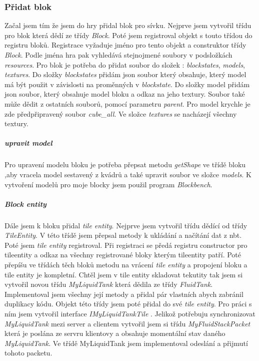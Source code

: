 \documentclass[FM,RP]{tulthesis}
\begin{document}
\subsubsection{Přidat blok}
    Začal jsem tím že jsem do hry přidal blok pro sívku. Nejprve jsem vytvořil třídu pro blok která dědí ze třídy  \textit{Block}. Poté jsem  registroval objekt s touto třídou do registru bloků. Registrace vyžaduje jméno pro tento objekt a  construktor třídy \textit{Block}. Podle jména hra pak vyhledává stejnojmené soubory v podsložkách \textit{resources}.  Pro blok je potřeba do přidat soubor do složek : \textit{blockstates}, \textit{models}, \textit{textures}. Do složky \textit{blockstates} přidám json soubor který obsahuje, který model má být použit v závislosti na proměnných v \textit{blockstate}.  Do složky model přidám json soubor, který obsahuje model bloku a odkaz na jeho textury. Soubor také může dědit z ostatních souborů, pomocí parametru \textit{parent}. Pro model krychle je zde předpřipravený soubor \textit{cube_all}. Ve složce \textit{textures} se nacházejí všechny textury.
\begin{comment}
    Tímto jsem přidal do hry blok, ten ale nemá žádné funkce.
\end{comment}
\subparagraph{upravit model}
Pro upravení modelu bloku je potřeba přepsat metodu \textit{getShape} ve třídě bloku ,aby vracela model sestavený z kvádrů a také upravit soubor ve složce \textit{models}. K vytvoření modelů pro moje blocky jsem použil program \textit{Blockbench}.
\subparagraph{Block entity}
Dále jsem k bloku přidal \textit{tile entity}. Nejprve jsem vytvořil třídu dědící od třídy \textit{TileEntity}. V této třídě jsem přepsal metody k ukládání a načítání dat z nbt. Poté jsem \textit{tile entity} registroval. Při registraci se předá registru constructor pro tileentity a odkaz na všechny registrované bloky kterým tileentity patří. Poté přepíšu ve třídách těch bloků metodu na vrácení \textit{tile entity} a propojení bloku a tile entity je kompletní. 
    Chtěl jsem v tile entity skladovat tekutity tak jsem si vytvořil novou třídu  \textit{MyLiquidTank} která dědila ze třídy \textit{FluidTank}. Implementoval jsem všechny její metody a přidal pár vlastních abych zabránil duplikacy kódu. Objekt této třídy jsem poté přidal do své\textit{ tile entity}. Pro práci s ním jsem vytvořil interface \textit{IMyLiquidTankTile} . 
    Jelikož potřebuju synchronizovat \textit{MyLiquidTank} mezi server a clientem vytvořil jsem si třídu  \textit{MyFluidStackPacket} která je poslána ze servru klientovy a obsahuje momentální stav daného \textit{MyLiquidTank}. Ve třídě MyLiquidTank jsem implementoval odeslání a přijmutí tohoto packetu. 
\end{document}

